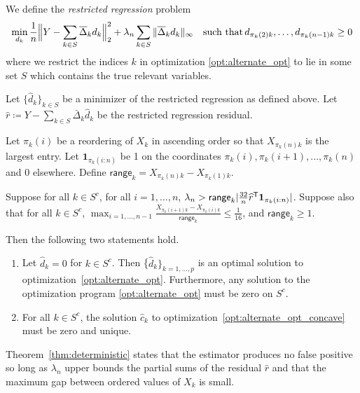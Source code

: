 \begin{definition}
\label{def:restricted_regression}
We define the \emph{restricted regression} problem 
\[
\min_{d_k} \frac{1}{n} \Big\| Y - \sum_{k \in S} \overline{\Delta}_k d_k \Big\|_2^2 + 
   \lambda_n \sum_{k \in S} \| \overline{\Delta}_k d_k \|_\infty \quad \textrm{such that} \, d_{\pi_k(2)k}, \ldots, d_{\pi_k(n-1)k} \geq 0
\]
where we restrict the indices $k$ in
optimization \eqref{opt:alternate_opt} to lie in some set $S$ which contains the true
relevant variables.
\end{definition}



\begin{theorem}
\label{thm:deterministic}
Let $\{\hat{d}_k \}_{k \in S}$ be a minimizer of the restricted regression as defined above.
Let $\hat{r} \coloneqq Y - \sum_{k \in S} \bar{\Delta}_k \hat{d}_k$ be the restricted regression residual. 

Let $\pi_k(i)$ be a reordering of $X_k$ in ascending order so that $X_{\pi_k(n)k}$ is the largest entry. Let $\mathbf{1}_{\pi_k(i:n)}$ be 1 on the coordinates $\pi_k(i),\pi_k(i+1),...,\pi_k(n)$ and 0 elsewhere. Define $\mathsf{range}_k = X_{\pi_k(n)k} - X_{\pi_k(1)k}$.

Suppose for all $k\in S^c$, for all $i=1,\ldots,n$, $\lambda_n > \mathsf{range}_k| \frac{32}{n} \widehat{r}^{\mathsf{T}} \mbox{\boldmath $1$}_{\pi_k(i:n)}|$. Suppose also that for all $k \in S^c$, $\max_{i=1,...,n-1} \frac{X_{\pi_k(i+1)k} - X_{\pi_k(i)k}}{\mathsf{range}_k} \leq \frac{1}{16}$, and $\mathsf{range}_k \geq 1$.

Then the following two statements hold.
\begin{enumerate}
\item Let $\hat{d}_k = 0$ for $k \in S^c$.  Then
  \{$\hat{d}_k\}_{k=1,\ldots,p}$ is an optimal solution to
  optimization~\eqref{opt:alternate_opt}. Furthermore, any solution to
  the optimization program \eqref{opt:alternate_opt} must be zero on
  $S^c$.
\item For all $k \in S^c$, the solution $\hat{c}_k$ to optimization~\eqref{opt:alternate_opt_concave} must be zero and unique.
\end{enumerate}

\end{theorem}

Theorem~\ref{thm:deterministic} states that the estimator produces no false positive so long as $\lambda_n$ upper bounds the partial sums of the residual $\hat{r}$ and that the maximum gap between ordered values of $X_k$ is small. 

